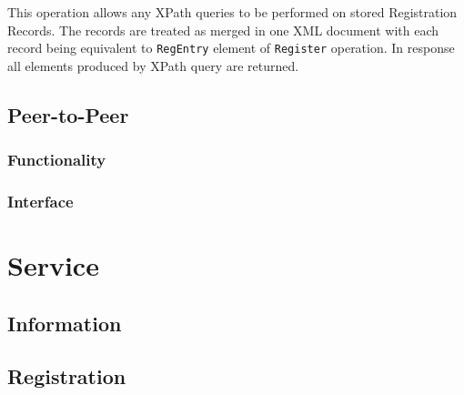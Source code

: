 \documentclass{book}
\begin{document}
This operation allows any XPath queries to be performed on stored Registration Records. The records are treated as merged in one XML document with each record being equivalent to \texttt{RegEntry} element of \texttt{Register} operation. In response all elements produced by XPath query are returned.




\section{Peer-to-Peer} %
\label{sec:peer_to_peer}

\subsection{Functionality} %
\label{sub:functionality}


\subsection{Interface} %
\label{sub:interface}




\chapter{Service} %
\label{cha:service}

\section{Information} %
\label{sec:information}


\section{Registration} %
\label{sec:registration}



% 
\end{document}
